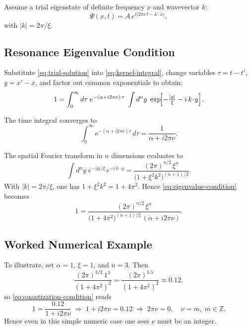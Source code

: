 Assume a trial eigenstate of definite frequency \(\nu\) and wavevector \(k\):
\begin{equation}
\Psi(x,t) = A\,e^{i\bigl(2\pi\nu\,t - k\!\cdot\!x\bigr)},
\label{eq:trial-solution}
\end{equation}
with \(|k| = 2\pi/\xi\).  

\subsection{Resonance Eigenvalue Condition}
\label{sec:quantum-eigenvalue}

Substitute \eqref{eq:trial-solution} into \eqref{eq:kernel-integral}, change variables \(\tau = t - t'\), \(y = x' - x\), and factor out common exponentials to obtain:
\begin{equation}
1 
= \int_{0}^{\infty} d\tau\; e^{-(\alpha + i2\pi\nu)\,\tau}
  \;\int d^n y\;\exp\!\Bigl[-\tfrac{|y|}{\xi}-i\,k\!\cdot\!y\Bigr].
\label{eq:eigenvalue-condition}
\end{equation}

The time integral converges to
\begin{equation}
\int_{0}^{\infty} e^{-(\alpha + i2\pi\nu)\tau}\,d\tau
= \frac{1}{\alpha + i2\pi\nu}.
\label{eq:time-integral}
\end{equation}

The spatial Fourier transform in \(n\) dimensions evaluates to
\begin{equation}
\int d^n y\;e^{-|y|/\xi}\,e^{-i\,k\cdot y}
= \frac{(2\pi)^{n/2}\,\xi^n}{\bigl(1 + \xi^2 k^2\bigr)^{(n+1)/2}}.
\label{eq:spatial-integral}
\end{equation}
With \(|k| = 2\pi/\xi\), one has \(1 + \xi^2 k^2 = 1 + 4\pi^2\).  Hence \eqref{eq:eigenvalue-condition} becomes
\begin{equation}
1 
= \frac{(2\pi)^{n/2}\,\xi^n}
       {\bigl(1 + 4\pi^2\bigr)^{(n+1)/2}\,(\alpha + i2\pi\nu)}.
\label{eq:quantization-condition}
\end{equation}

\subsection{Worked Numerical Example}
\label{sec:quantum-numerical}

To illustrate, set \(\alpha=1\), \(\xi=1\), and \(n=3\).  Then
\[
\frac{(2\pi)^{3/2}\,1^3}{(1+4\pi^2)^2}= \frac{(2\pi)^{1.5}}{(1+4\pi^2)^2}
\approx 0.12,
\]
so \eqref{eq:quantization-condition} reads
\[
1 = \frac{0.12}{1 + i2\pi\nu}
\;\Longrightarrow\;
1 + i2\pi\nu = 0.12
\;\Longrightarrow\;
2\pi\nu = 0,\quad\nu = m,\;m\in\mathbb{Z}.
\]
Hence even in this simple numeric case one sees \(\nu\) must be an integer.

